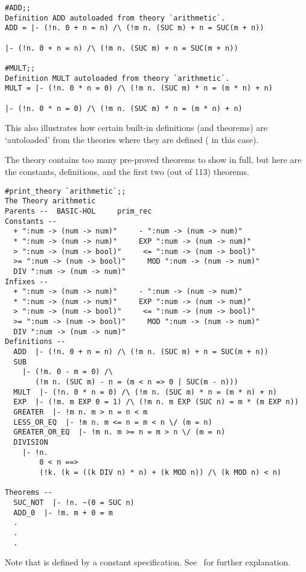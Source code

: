 \begin{session}\begin{verbatim}
#ADD;;
Definition ADD autoloaded from theory `arithmetic`.
ADD = |- (!n. 0 + n = n) /\ (!m n. (SUC m) + n = SUC(m + n))

|- (!n. 0 + n = n) /\ (!m n. (SUC m) + n = SUC(m + n))

#MULT;;
Definition MULT autoloaded from theory `arithmetic`.
MULT = |- (!n. 0 * n = 0) /\ (!m n. (SUC m) * n = (m * n) + n)

|- (!n. 0 * n = 0) /\ (!m n. (SUC m) * n = (m * n) + n)
\end{verbatim}\end{session}

\noindent This also illustrates how certain built-in definitions (and theorems)
are `autoloaded' from the theories where they are defined ( in this
case).

\newpage %

The theory   contains  too many  pre-proved theorems  to show in
full, but  here are  the constants,  definitions, and  the first  two (out of
113) theorems.

\begin{session}\begin{verbatim}
#print_theory `arithmetic`;;
The Theory arithmetic
Parents --  BASIC-HOL     prim_rec
Constants --
  + ":num -> (num -> num)"     - ":num -> (num -> num)"
  * ":num -> (num -> num)"     EXP ":num -> (num -> num)"
  > ":num -> (num -> bool)"     <= ":num -> (num -> bool)"
  >= ":num -> (num -> bool)"     MOD ":num -> (num -> num)"
  DIV ":num -> (num -> num)"
Infixes --
  + ":num -> (num -> num)"     - ":num -> (num -> num)"
  * ":num -> (num -> num)"     EXP ":num -> (num -> num)"
  > ":num -> (num -> bool)"     <= ":num -> (num -> bool)"
  >= ":num -> (num -> bool)"     MOD ":num -> (num -> num)"
  DIV ":num -> (num -> num)"
Definitions --
  ADD  |- (!n. 0 + n = n) /\ (!m n. (SUC m) + n = SUC(m + n))
  SUB
    |- (!m. 0 - m = 0) /\
       (!m n. (SUC m) - n = (m < n => 0 | SUC(m - n)))
  MULT  |- (!n. 0 * n = 0) /\ (!m n. (SUC m) * n = (m * n) + n)
  EXP  |- (!m. m EXP 0 = 1) /\ (!m n. m EXP (SUC n) = m * (m EXP n))
  GREATER  |- !m n. m > n = n < m
  LESS_OR_EQ  |- !m n. m <= n = m < n \/ (m = n)
  GREATER_OR_EQ  |- !m n. m >= n = m > n \/ (m = n)
  DIVISION
    |- !n.
        0 < n ==>
        (!k. (k = ((k DIV n) * n) + (k MOD n)) /\ (k MOD n) < n)

Theorems --
  SUC_NOT  |- !n. ~(0 = SUC n)
  ADD_0  |- !m. m + 0 = m
  .
  .
  .
\end{verbatim}\end{session}

\noindent Note that  is defined by a constant specification. See
\DESCRIPTION\ for further explanation.
















